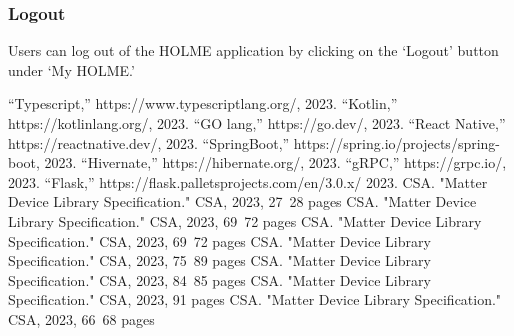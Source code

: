 \documentclass[conference]{IEEEtran}
\begin{document}
\subsubsection{Logout}
Users can log out of the HOLME application by clicking on the `Logout' button under `My HOLME.'

\clearpage

\clearpage
\begin{thebibliography}{9}
  “Typescript,” https://www.typescriptlang.org/, 2023.
  “Kotlin,” https://kotlinlang.org/, 2023.
  “GO lang,” https://go.dev/, 2023.
  “React Native,” https://reactnative.dev/, 2023.
  “SpringBoot,” https://spring.io/projects/spring-boot, 2023.
  “Hivernate,” https://hibernate.org/, 2023.
  “gRPC,” https://grpc.io/, 2023.
  “Flask,” https://flask.palletsprojects.com/en/3.0.x/ 2023.
 CSA. "Matter Device Library Specification." CSA, 2023, 27~28 pages
 CSA. "Matter Device Library Specification." CSA, 2023, 69~72 pages
 CSA. "Matter Device Library Specification." CSA, 2023, 69~72 pages
 CSA. "Matter Device Library Specification." CSA, 2023, 75~89 pages
 CSA. "Matter Device Library Specification." CSA, 2023, 84~85 pages
 CSA. "Matter Device Library Specification." CSA, 2023, 91 pages
 CSA. "Matter Device Library Specification." CSA, 2023, 66~68 pages

\end{thebibliography}
\end{document}
